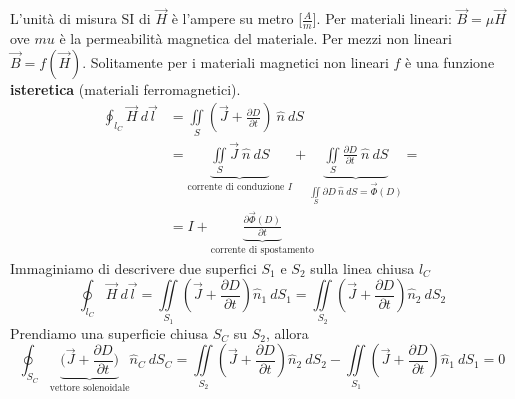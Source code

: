 \documentclass{article}
\begin{document}
L'unità di misura SI di $\vec H$ è l'ampere su metro [$\frac{A}{m}$].
Per materiali lineari: $\vec B = \mu \vec H$ ove $mu$ è la permeabilità magnetica del materiale. Per mezzi non lineari
$\vec B = f(\vec H)$. Solitamente per i materiali magnetici non lineari $f$ è una funzione \textbf{isteretica} (materiali
ferromagnetici).
\begin{align*}
    \oint_{l_C}\vec H \ d \vec l &= \iint\limits_{S} \left( \vec J + \frac{\partial
    D}{\partial t} \right) \ \hat n \ dS\\
    &= \underbrace{\iint\limits_{S} \vec J \ \hat n \ dS}_{\text{corrente di conduzione } I} + \underbrace{\iint\limits_{S} \frac{\partial D}{\partial t} \ \hat n \ dS}_{\iint\limits_{S} \partial D \ \hat n \ dS =\vec \Phi(D)} =\\
    &= I + \underbrace{\frac{\partial \vec \Phi(D)}{\partial t}}_{\text{corrente di spostamento}}
\end{align*}
Immaginiamo di descrivere due superfici $S_1$ e $S_2$ sulla linea chiusa $l_C$
\[
    \oint_{l_C} \vec H \ d\vec l = \iint\limits_{S_1}\left( \vec J + \frac{\partial D}{\partial t} \right) \hat n_1 \ dS_1 = \iint\limits_{S_2}\left( \vec J + \frac{\partial D}{\partial t} \right) \hat n_2 \ dS_2
\]
Prendiamo una superficie chiusa $S_C$ su $S_2$, allora
\[
    \oint_{S_C}\underbrace{\bigg( \vec J + \frac{\partial D}{\partial t}\bigg)}_{\text{vettore solenoidale}}\hat n_C \ dS_C = \iint\limits_{S_2}\left( \vec J + \frac{\partial D}{\partial t} \right) \hat n_2 \ dS_2 - \iint\limits_{S_1}\left( \vec J + \frac{\partial D}{\partial t} \right) \hat n_1 \ dS_1 = 0
\]
\end{document}
